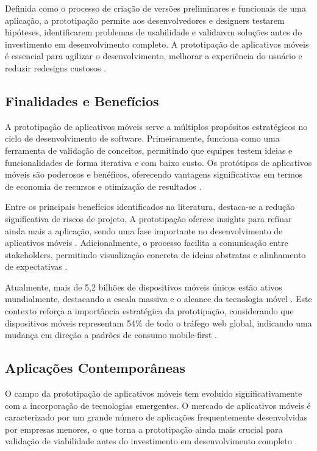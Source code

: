 Definida como o processo de criação de versões preliminares e funcionais de uma aplicação, a prototipação permite aos desenvolvedores e designers testarem hipóteses, identificarem problemas de usabilidade e validarem soluções antes do investimento em desenvolvimento completo. A prototipação de aplicativos móveis é essencial para agilizar o desenvolvimento, melhorar a experiência do usuário e reduzir redesigns custosos \cite{decode_benefits}.

\subsection{Finalidades e Benefícios}

A prototipação de aplicativos móveis serve a múltiplos propósitos estratégicos no ciclo de desenvolvimento de software. Primeiramente, funciona como uma ferramenta de validação de conceitos, permitindo que equipes testem ideias e funcionalidades de forma iterativa e com baixo custo. Os protótipos de aplicativos móveis são poderosos e benéficos, oferecendo vantagens significativas em termos de economia de recursos e otimização de resultados \cite{gojilabs_essential}.

Entre os principais benefícios identificados na literatura, destaca-se a redução significativa de riscos de projeto. A prototipação oferece insights para refinar ainda mais a aplicação, sendo uma fase importante no desenvolvimento de aplicativos móveis \cite{softsuave_guide}. Adicionalmente, o processo facilita a comunicação entre stakeholders, permitindo visualização concreta de ideias abstratas e alinhamento de expectativas \cite{okoone_benefits}.

Atualmente, mais de 5,2 bilhões de dispositivos móveis únicos estão ativos mundialmente, destacando a escala massiva e o alcance da tecnologia móvel \cite{netguru_prototyping}. Este contexto reforça a importância estratégica da prototipação, considerando que dispositivos móveis representam 54\% de todo o tráfego web global, indicando uma mudança em direção a padrões de consumo mobile-first \cite{netguru_prototyping}.


\subsection{Aplicações Contemporâneas}

O campo da prototipação de aplicativos móveis tem evoluído significativamente com a incorporação de tecnologias emergentes. O mercado de aplicativos móveis é caracterizado por um grande número de aplicações frequentemente desenvolvidas por empresas menores, o que torna a prototipação ainda mais crucial para validação de viabilidade antes do investimento em desenvolvimento completo \cite{researchgate_ai_prototyping}.

